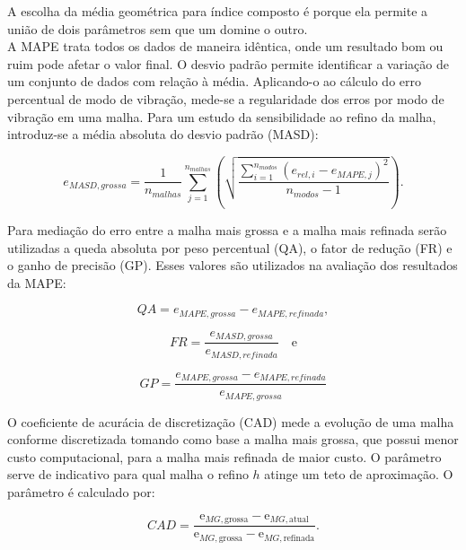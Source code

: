 A escolha da média geométrica para índice composto é porque ela permite a união de dois parâmetros sem que um domine o outro.\\
\indent A MAPE trata todos os dados de maneira idêntica, onde um resultado bom ou ruim pode afetar o valor final. O desvio padrão permite identificar a variação de um conjunto de dados com relação à média. Aplicando-o ao cálculo do erro percentual de modo de vibração, mede-se a regularidade dos erros por modo de vibração em uma malha. Para um estudo da sensibilidade ao refino da malha, introduz-se a média absoluta do desvio padrão (MASD): 

\begin{equation}
    e_{MASD,grossa} = \frac{1}{n_{malhas}} \sum_{j=1}^{n_{malhas}} \left(\sqrt{\frac{\sum_{i=1}^{n_{modos}}(e_{rel,i} - e_{MAPE,j})^2}{n_{modos}-1}} \right).
    \label{eq:1.a1}
\end{equation}

\indent Para mediação do erro entre a malha mais grossa e a malha mais refinada serão utilizadas a queda absoluta por peso percentual (QA), o fator de redução (FR) e o ganho de precisão (GP). Esses valores são utilizados na avaliação dos resultados da MAPE:

\begin{equation}
    QA = e_{MAPE,grossa} - e_{MAPE,refinada},
    \label{eq:1.a2}
\end{equation}

\begin{equation}
    FR = \frac{e_{MASD,grossa}}{e_{MASD,refinada}} \quad \text{e}
    \label{eq:1.a3}
\end{equation}

\begin{equation}
    GP = \frac{e_{MAPE,grossa} - e_{MAPE,refinada}}{e_{MAPE,grossa}}
    \label{eq:1.a4}
\end{equation}

\indent O coeficiente de acurácia de discretização (CAD) mede a evolução de uma malha conforme discretizada tomando como base a malha mais grossa, que possui menor custo computacional, para a malha mais refinada de maior custo. O parâmetro serve de indicativo para qual malha o refino $h$ atinge um teto de aproximação. O parâmetro é calculado por:

\begin{equation}
    CAD = \frac{\text{e}_{MG,\text{grossa}} - \text{e}_{MG,\text{atual}}}{\text{e}_{MG,\text{grossa}} - \text{e}_{MG,\text{refinada}}}.
    \label{eq:1.5}
\end{equation}


